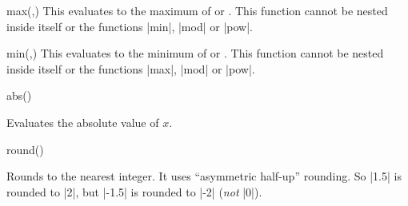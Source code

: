 \begin{math-function}{max(,)}
	This evaluates to the maximum of  or . This function 
	cannot be nested inside itself or the functions |min|, |mod| or 
	|pow|.

\begin{codeexample}[]
 \pgfmathresult
\end{codeexample}

\end{math-function}

\begin{math-function}{min(,)}
	This evaluates to the minimum of  or . This function 
	cannot be nested inside itself or the functions |max|, |mod| or 
	|pow|.

\begin{codeexample}[]
 \pgfmathresult
\end{codeexample}

\end{math-function}

\begin{math-function}{abs()} 

	Evaluates the absolute value of $x$.
	
\begin{codeexample}[]
 \pgfmathresult
\end{codeexample}

\begin{codeexample}[]
 \pgfmathresult
\end{codeexample}

\end{math-function}

\begin{math-function}{round()}

	Rounds  to the nearest integer. It uses ``asymmetric half-up'' 
	rounding. So |1.5| is rounded to |2|, but |-1.5| is rounded to |-2| 
	(\emph{not} |0|).

\begin{codeexample}[]
 \pgfmathresult
\end{codeexample}

\begin{codeexample}[]
 \pgfmathresult
\end{codeexample}

\end{math-function}

